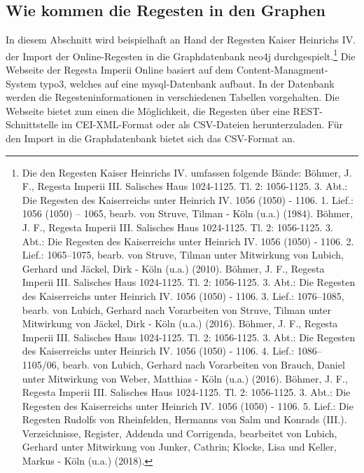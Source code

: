 \documentclass[12pt,ngerman,]{article}
\begin{document}
\subsection{Wie kommen die Regesten in den
Graphen}\label{wie-kommen-die-regesten-in-den-graphen}

In diesem Abschnitt wird beispielhaft an Hand der Regesten Kaiser
Heinrichs IV. der Import der Online-Regesten in die Graphdatenbank neo4j
durchgespielt.\footnote{Die den Regesten Kaiser Heinrichs IV. umfassen
  folgende Bände: Böhmer, J. F., Regesta Imperii III. Salisches Haus
  1024-1125. Tl. 2: 1056-1125. 3. Abt.: Die Regesten des Kaiserreichs
  unter Heinrich IV. 1056 (1050) - 1106. 1. Lief.: 1056 (1050) -- 1065,
  bearb. von Struve, Tilman - Köln (u.a.) (1984). Böhmer, J. F., Regesta
  Imperii III. Salisches Haus 1024-1125. Tl. 2: 1056-1125. 3. Abt.: Die
  Regesten des Kaiserreichs unter Heinrich IV. 1056 (1050) - 1106. 2.
  Lief.: 1065--1075, bearb. von Struve, Tilman unter Mitwirkung von
  Lubich, Gerhard und Jäckel, Dirk - Köln (u.a.) (2010). Böhmer, J. F.,
  Regesta Imperii III. Salisches Haus 1024-1125. Tl. 2: 1056-1125. 3.
  Abt.: Die Regesten des Kaiserreichs unter Heinrich IV. 1056 (1050) -
  1106. 3. Lief.: 1076--1085, bearb. von Lubich, Gerhard nach
  Vorarbeiten von Struve, Tilman unter Mitwirkung von Jäckel, Dirk -
  Köln (u.a.) (2016). Böhmer, J. F., Regesta Imperii III. Salisches Haus
  1024-1125. Tl. 2: 1056-1125. 3. Abt.: Die Regesten des Kaiserreichs
  unter Heinrich IV. 1056 (1050) - 1106. 4. Lief.: 1086--1105/06, bearb.
  von Lubich, Gerhard nach Vorarbeiten von Brauch, Daniel unter
  Mitwirkung von Weber, Matthias - Köln (u.a.) (2016). Böhmer, J. F.,
  Regesta Imperii III. Salisches Haus 1024-1125. Tl. 2: 1056-1125. 3.
  Abt.: Die Regesten des Kaiserreichs unter Heinrich IV. 1056 (1050) -
  1106. 5. Lief.: Die Regesten Rudolfs von Rheinfelden, Hermanns von
  Salm und Konrads (III.). Verzeichnisse, Register, Addenda und
  Corrigenda, bearbeitet von Lubich, Gerhard unter Mitwirkung von
  Junker, Cathrin; Klocke, Lisa und Keller, Markus - Köln (u.a.) (2018).}
Die Webseite der Regesta Imperii Online basiert auf dem
Content-Managment-System typo3, welches auf eine mysql-Datenbank
aufbaut. In der Datenbank werden die Regesteninformationen in
verschiedenen Tabellen vorgehalten. Die Webseite bietet zum einen die
Möglichkeit, die Regesten über eine REST-Schnittstelle im CEI-XML-Format
oder als CSV-Dateien herunterzuladen. Für den Import in die
Graphdatenbank bietet sich das CSV-Format an.
\end{document}

